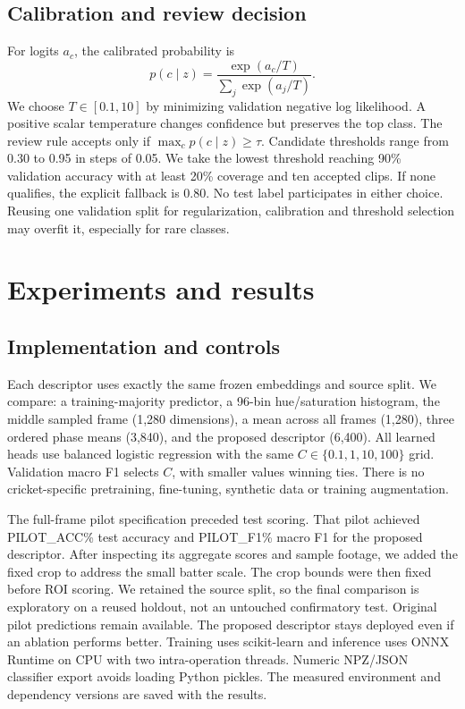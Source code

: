 \subsection{Calibration and review decision}
For logits $a_c$, the calibrated probability is
\begin{equation}
p(c\mid z)=\frac{\exp(a_c/T)}{\sum_j\exp(a_j/T)}.
\end{equation}
We choose $T\in[0.1,10]$ by minimizing validation negative log likelihood. A positive scalar temperature changes confidence but preserves the top class. The review rule accepts only if $\max_c p(c\mid z)\geq\tau$. Candidate thresholds range from 0.30 to 0.95 in steps of 0.05. We take the lowest threshold reaching 90\% validation accuracy with at least 20\% coverage and ten accepted clips. If none qualifies, the explicit fallback is 0.80. No test label participates in either choice. Reusing one validation split for regularization, calibration and threshold selection may overfit it, especially for rare classes.

\section{Experiments and results}
\subsection{Implementation and controls}
Each descriptor uses exactly the same frozen embeddings and source split. We compare: a training-majority predictor, a 96-bin hue/saturation histogram, the middle sampled frame (1,280 dimensions), a mean across all frames (1,280), three ordered phase means (3,840), and the proposed descriptor (6,400). All learned heads use balanced logistic regression with the same $C\in\{0.1,1,10,100\}$ grid. Validation macro F1 selects $C$, with smaller values winning ties. There is no cricket-specific pretraining, fine-tuning, synthetic data or training augmentation.

The full-frame pilot specification preceded test scoring. That pilot achieved {{PILOT_ACC}}\% test accuracy and {{PILOT_F1}}\% macro F1 for the proposed descriptor. After inspecting its aggregate scores and sample footage, we added the fixed crop to address the small batter scale. The crop bounds were then fixed before ROI scoring. We retained the source split, so the final comparison is exploratory on a reused holdout, not an untouched confirmatory test. Original pilot predictions remain available. The proposed descriptor stays deployed even if an ablation performs better. Training uses scikit-learn and inference uses ONNX Runtime on CPU with two intra-operation threads. Numeric NPZ/JSON classifier export avoids loading Python pickles. The measured environment and dependency versions are saved with the results.

